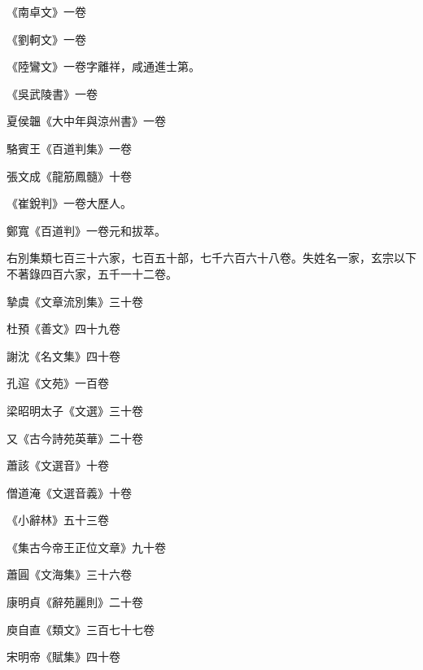 \begin{pinyinscope}
 《南卓文》一卷



 《劉軻文》一卷



 《陸鸞文》一卷字離祥，咸通進士第。



 《吳武陵書》一卷



 夏侯韞《大中年與涼州書》一卷



 駱賓王《百道判集》一卷



 張文成《龍筋鳳髓》十卷



 《崔銳判》一卷大歷人。



 鄭寬《百道判》一卷元和拔萃。



 右別集類七百三十六家，七百五十部，七千六百六十八卷。失姓名一家，玄宗以下不著錄四百六家，五千一十二卷。



 摯虞《文章流別集》三十卷



 杜預《善文》四十九卷



 謝沈《名文集》四十卷



 孔逭《文苑》一百卷



 梁昭明太子《文選》三十卷



 又《古今詩苑英華》二十卷



 蕭該《文選音》十卷



 僧道淹《文選音義》十卷



 《小辭林》五十三卷



 《集古今帝王正位文章》九十卷



 蕭圓《文海集》三十六卷



 康明貞《辭苑麗則》二十卷



 庾自直《類文》三百七十七卷



 宋明帝《賦集》四十卷




\end{pinyinscope}
